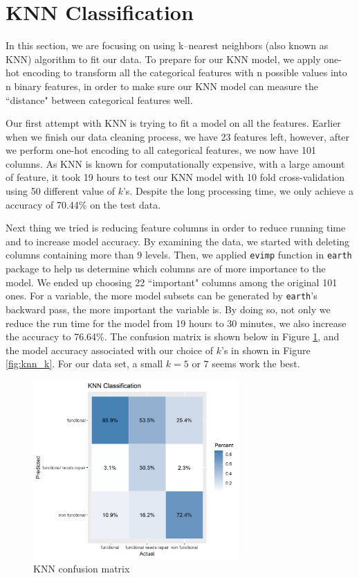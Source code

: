 \section{KNN Classification} \label{knn}
In this section, we are focusing on using k--nearest neighbors (also known as KNN) algorithm to fit our data. To prepare for our KNN model, we apply one-hot encoding to transform all the categorical features with n possible values into n binary features, in order to make sure our KNN model can measure the ``distance" between categorical features well.

Our first attempt with KNN is trying to fit a model on all the features. Earlier when we finish our data cleaning process, we have 23 features left, however, after we perform one-hot encoding to all categorical features, we now have 101 columns. As KNN is known for computationally expensive, with a large amount of feature, it took 19 hours to test our KNN model with 10 fold cross-validation using 50 different value of $k$'s. Despite the long processing time, we only achieve a accuracy of 70.44\% on the test data. 

Next thing we tried is reducing feature columns in order to reduce running time and to increase model accuracy. By examining the data, we started with deleting columns containing more than 9 levels. Then, we applied \texttt{evimp} function in \texttt{earth} package to help us determine which columns are of more importance to the model. We ended up choosing 22 ``important" columns among the original 101 ones. For a variable, the more model subsets can be generated by \texttt{earth}’s backward pass, the more important the variable is. By doing so, not only we reduce the run time for the model from 19 hours to 30 minutes, we also increase the accuracy to 76.64\%. The confusion matrix is shown below in Figure \ref{fig:knnConf}, and the model accuracy associated with our choice of $k$'s in shown in Figure \ref{fig:knn_k}. For our data set, a small $k=5$ or $7$ seems work the best. 

\begin{figure}[h]
    \centering
    \includegraphics[width = 0.7\textwidth]{Figures/KNNConfMatrix.png}
    \caption{KNN confusion matrix}
    \label{fig:knnConf}
\end{figure}


